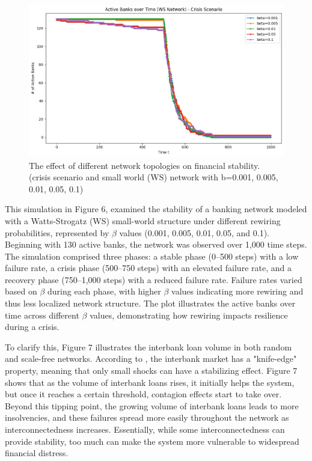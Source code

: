 \documentclass{article} %
\begin{document}
\begin{figure}[h]
    \centering
    \includegraphics[width=0.8\linewidth]{Figures/Figure_3_2.png}
    \caption{The effect of different network topologies on financial stability. (crisis scenario and small world (WS) network with b=0.001, 0.005, 0.01, 0.05, 0.1)}
    \label{fig:figure3.2}
\end{figure}
This simulation in Figure 6, examined the stability of a banking network modeled with a Watts-Strogatz (WS) small-world structure under different rewiring probabilities, represented by \( \beta \) values (0.001, 0.005, 0.01, 0.05, and 0.1). Beginning with 130 active banks, the network was observed over 1,000 time steps. The simulation comprised three phases: a stable phase (0--500 steps) with a low failure rate, a crisis phase (500--750 steps) with an elevated failure rate, and a recovery phase (750--1,000 steps) with a reduced failure rate. Failure rates varied based on \( \beta \) during each phase, with higher \( \beta \) values indicating more rewiring and thus less localized network structure. The plot illustrates the active banks over time across different \( \beta \) values, demonstrating how rewiring impacts resilience during a crisis.


To clarify this, Figure 7 illustrates the interbank loan volume in both random and scale-free networks. According to \cite{ladley2011contagion}, the interbank market has a "knife-edge" property, meaning that only small shocks can have a stabilizing effect. Figure 7  shows that as the volume of interbank loans rises, it initially helps the system, but once it reaches a certain threshold, contagion effects start to take over. Beyond this tipping point, the growing volume of interbank loans leads to more insolvencies, and these failures spread more easily throughout the network as interconnectedness increases. Essentially, while some interconnectedness can provide stability, too much can make the system more vulnerable to widespread financial distress.
\end{document}

